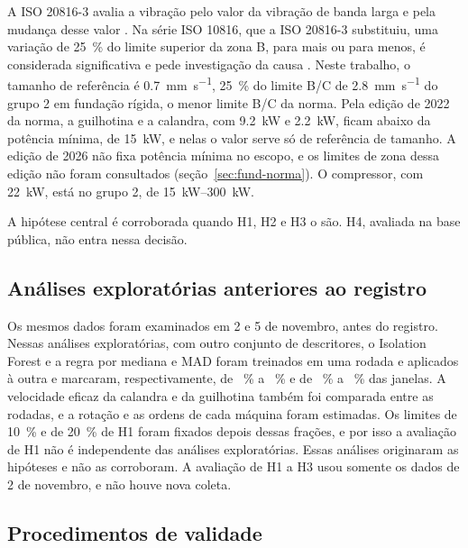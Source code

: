 A ISO 20816-3 avalia a vibração pelo valor da vibração de banda larga e pela mudança desse valor \cite{iso208163_2022}. Na série ISO 10816, que a ISO 20816-3 substituiu, uma variação de \SI{25}{\percent} do limite superior da zona B, para mais ou para menos, é considerada significativa e pede investigação da causa \cite{schwirzer2002}. Neste trabalho, o tamanho de referência é \SI{0,7}{\milli\meter\per\second}, \SI{25}{\percent} do limite B/C de \SI{2,8}{\milli\meter\per\second} do grupo 2 em fundação rígida, o menor limite B/C da norma. Pela edição de 2022 da norma, a guilhotina e a calandra, com \SI{9,2}{\kilo\watt} e \SI{2,2}{\kilo\watt}, ficam abaixo da potência mínima, de \SI{15}{\kilo\watt}, e nelas o valor serve só de referência de tamanho. A edição de 2026 não fixa potência mínima no escopo, e os limites de zona dessa edição não foram consultados (seção~\ref{sec:fund-norma}). O compressor, com \SI{22}{\kilo\watt}, está no grupo 2, de \SIrange{15}{300}{\kilo\watt}.

A hipótese central é corroborada quando H1, H2 e H3 o são. H4, avaliada na base pública, não entra nessa decisão.

\subsection{Análises exploratórias anteriores ao registro}\label{sec:preliminares}

Os mesmos dados foram examinados em 2 e 5 de novembro, antes do registro. Nessas análises exploratórias, com outro conjunto de descritores, o Isolation Forest e a regra por mediana e MAD foram treinados em uma rodada e aplicados à outra e marcaram, respectivamente, de \registroExplIfMin~\% a \registroExplIfMax~\% e de \registroExplMadMin~\% a \registroExplMadMax~\% das janelas. A velocidade eficaz da calandra e da guilhotina também foi comparada entre as rodadas, e a rotação e as ordens de cada máquina foram estimadas. Os limites de \SI{10}{\percent} e de \SI{20}{\percent} de H1 foram fixados depois dessas frações, e por isso a avaliação de H1 não é independente das análises exploratórias. Essas análises originaram as hipóteses e não as corroboram. A avaliação de H1 a H3 usou somente os dados de 2 de novembro, e não houve nova coleta.

\subsection{Procedimentos de validade}\label{sec:validade-proc}

